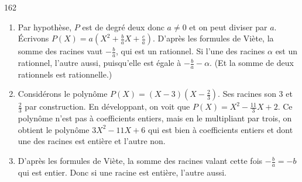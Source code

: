 \begin{Soln}{162}
\begin{enumerate}
\item Par hypothèse, $P$ est de degré deux donc $a\neq 0$ et on peut diviser par $a$. Écrivons $P(X) = a\left(X^2+\frac{b}{a}X+\frac{c}{a}\right)$. D'après les formules de Viète, la somme des racines vaut $-\frac{b}{a}$, qui est un rationnel. Si l'une des racines $\alpha$ est un rationnel, l'autre aussi, puisqu'elle est égale à $-\frac{b}{a}-\alpha$. (Et la somme de deux rationnels est rationnelle.)
\item Considérons le polynôme $P(X)=(X-3)(X-\frac23)$. Ses racines son $3$ et $\frac23$ par construction. En développant, on voit que $P(X) = X^2-\frac{11}{3}X+2$. Ce polynôme n'est pas à coefficients entiers, mais en le multipliant par trois, on obtient le polynôme $3X^2-11X+6$  qui est bien à coefficients entiers et dont une des racines est entière et l'autre non.
\item D'après les formules de Viète, la somme des racines valant cette fois $-\frac{b}{a}=-b$ qui est entier. Donc si une racine est entière, l'autre aussi.
\end{enumerate}
\end{Soln}

